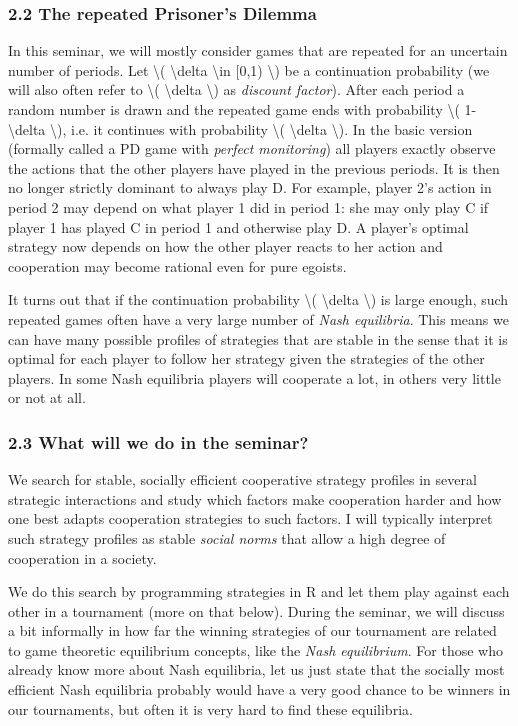 \documentclass[]{article}
\begin{document}
\subsubsection{2.2 The repeated Prisoner's Dilemma}

In this seminar, we will mostly consider games that are repeated for an
uncertain number of periods. Let \textbackslash{}( \textbackslash{}delta
\textbackslash{}in {[}0,1) \textbackslash{}) be a continuation
probability (we will also often refer to \textbackslash{}(
\textbackslash{}delta \textbackslash{}) as \emph{discount factor}).
After each period a random number is drawn and the repeated game ends
with probability \textbackslash{}( 1-\textbackslash{}delta
\textbackslash{}), i.e. it continues with probability \textbackslash{}(
\textbackslash{}delta \textbackslash{}). In the basic version (formally
called a PD game with \emph{perfect monitoring}) all players exactly
observe the actions that the other players have played in the previous
periods. It is then no longer strictly dominant to always play D. For
example, player 2's action in period 2 may depend on what player 1 did
in period 1: she may only play C if player 1 has played C in period 1
and otherwise play D. A player's optimal strategy now depends on how the
other player reacts to her action and cooperation may become rational
even for pure egoists.

It turns out that if the continuation probability \textbackslash{}(
\textbackslash{}delta \textbackslash{}) is large enough, such repeated
games often have a very large number of \emph{Nash equilibria}. This
means we can have many possible profiles of strategies that are stable
in the sense that it is optimal for each player to follow her strategy
given the strategies of the other players. In some Nash equilibria
players will cooperate a lot, in others very little or not at all.

\subsubsection{2.3 What will we do in the seminar?}

We search for stable, socially efficient cooperative strategy profiles
in several strategic interactions and study which factors make
cooperation harder and how one best adapts cooperation strategies to
such factors. I will typically interpret such strategy profiles as
stable \emph{social norms} that allow a high degree of cooperation in a
society.

We do this search by programming strategies in R and let them play
against each other in a tournament (more on that below). During the
seminar, we will discuss a bit informally in how far the winning
strategies of our tournament are related to game theoretic equilibrium
concepts, like the \emph{Nash equilibrium}. For those who already know
more about Nash equilibria, let us just state that the socially most
efficient Nash equilibria probably would have a very good chance to be
winners in our tournaments, but often it is very hard to find these
equilibria.
\end{document}
